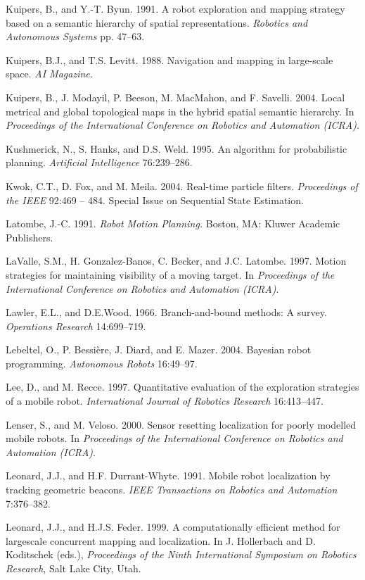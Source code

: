 \documentclass[10pt,a4paper]{article}
\begin{document}
Kuipers, B., and Y.-T. Byun. 1991. A robot exploration and mapping strategy based
on a semantic hierarchy of spatial representations. \textit{Robotics and Autonomous Systems}
pp. 47–63.

Kuipers, B.J., and T.S. Levitt. 1988. Navigation and mapping in large-scale space.\textit{ AI
Magazine.}

Kuipers, B., J. Modayil, P. Beeson, M. MacMahon, and F. Savelli. 2004. Local metrical
and global topological maps in the hybrid spatial semantic hierarchy. In \textit{Proceedings
of the International Conference on Robotics and Automation (ICRA)}.

Kushmerick, N., S. Hanks, and D.S. Weld. 1995. An algorithm for probabilistic planning.
\textit{Artificial Intelligence} 76:239–286.

Kwok, C.T., D. Fox, and M. Meila. 2004. Real-time particle filters. \textit{Proceedings of the
IEEE} 92:469 – 484. Special Issue on Sequential State Estimation.

Latombe, J.-C. 1991. \textit{Robot Motion Planning.} Boston, MA: Kluwer Academic Publishers.

LaValle, S.M., H. Gonzalez-Banos, C. Becker, and J.C. Latombe. 1997. Motion strategies
for maintaining visibility of a moving target. In \textit{Proceedings of the International
Conference on Robotics and Automation (ICRA)}.

Lawler, E.L., and D.E.Wood. 1966. Branch-and-bound methods: A survey. \textit{Operations
Research} 14:699–719.

Lebeltel, O., P. Bessière, J. Diard, and E. Mazer. 2004. Bayesian robot programming.
\textit{Autonomous Robots} 16:49–97.

Lee, D., and M. Recce. 1997. Quantitative evaluation of the exploration strategies of
a mobile robot. \textit{International Journal of Robotics Research} 16:413–447.

Lenser, S., and M. Veloso. 2000. Sensor resetting localization for poorly modelled mobile
robots. In \textit{Proceedings of the International Conference on Robotics and Automation
(ICRA)}.

Leonard, J.J., and H.F. Durrant-Whyte. 1991. Mobile robot localization by tracking
geometric beacons. \textit{IEEE Transactions on Robotics and Automation} 7:376–382.

Leonard, J.J., and H.J.S. Feder. 1999. A computationally efficient method for largescale
concurrent mapping and localization. In J. Hollerbach and D. Koditschek
(eds.), \textit{Proceedings of the Ninth International Symposium on Robotics Research}, Salt Lake
City, Utah.
\end{document}
